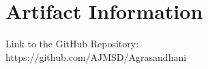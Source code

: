 \section{Artifact Information}

Link to the GitHub Repository: \\
https://github.com/AJMSD/Agrasandhani

